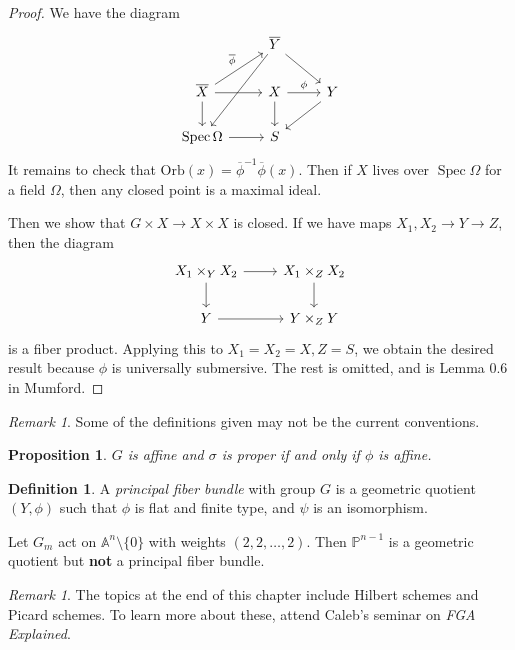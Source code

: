\documentclass[leqno, openany]{memoir}
\newtheorem{prop}[thm]{Proposition}
\theoremstyle{definition}
\newtheorem{defn}[thm]{Definition}
\theoremstyle{remark}
\newtheorem{rmk}[thm]{Remark}
\theoremstyle{plain}
\theoremstyle{definition}
\theoremstyle{remark}
\newcommand{\A}{\mathbb{A}}
\renewcommand{\P}{\mathbb{P}}
\newcommand{\mr}[1]{\mathrm{#1}}
\newcommand{\ol}[1]{\overline{#1}}
\DeclareMathOperator{\Spec}{Spec}
\begin{document}
\begin{proof}
    We have the diagram
    \begin{equation}
    \begin{tikzcd}
        & \ol{Y} \arrow{dr} \arrow{ddl} \\
        \ol{X} \arrow{r} \arrow{d} \arrow{ur}{\ol{\phi}} & X \arrow{r}{\phi} \arrow{d} & Y \arrow{dl} \\
        \Spec \Omega \arrow{r} & S
    \end{tikzcd}
    \end{equation}
    It remains to check that $\mr{Orb}(x) = \ol{\phi}^{-1} \ol{\phi}(x)$. Then if $X$ lives over $\Spec \Omega$ for a field $\Omega$, then any closed point is a maximal ideal.

    Then we show that $G \times X \to X \times X$ is closed. If we have maps $X_1,X_2 \to Y \to Z$, then the diagram
    \begin{equation}
    \begin{tikzcd}
        X_1 \times_Y X_2 \arrow{r} \arrow{d} & X_1 \times_Z X_2 \arrow{d} \\
        Y \arrow{r} & Y \times_Z Y
    \end{tikzcd}
    \end{equation}
is a fiber product. Applying this to $X_1 = X_2 = X, Z = S$, we obtain the desired result because $\phi$ is universally submersive. The rest is omitted, and is Lemma {0.6} in Mumford.
\end{proof}

\begin{rmk}
    Some of the definitions given may not be the current conventions.
\end{rmk}

\begin{prop}
    $G$ is affine and $\sigma$ is proper if and only if $\phi$ is affine.
\end{prop}

\begin{defn}
    A \textit{principal fiber bundle} with group $G$ is a geometric quotient $(Y, \phi)$ such that $\phi$ is flat and finite type, and $\psi$ is an isomorphism. 
\end{defn}

Let $G_m$ act on $\A^n \setminus \{0 \}$ with weights $(2,2,\ldots,2)$. Then $\P^{n-1}$ is a geometric quotient but \textbf{not} a principal fiber bundle.

\begin{rmk}
    The topics at the end of this chapter include Hilbert schemes and Picard schemes. To learn more about these, attend Caleb's seminar on \textit{FGA Explained}. 
\end{rmk}
\end{document}

